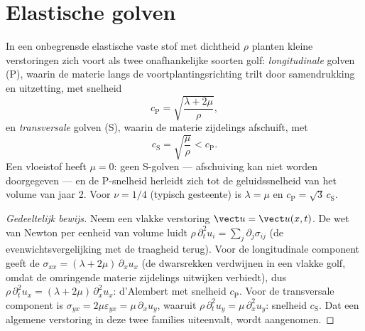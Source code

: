 \section{Elastische golven}

\begin{proposition}\label{prop:b3:continuum-elasticity:waves}
In een onbegrensde elastische vaste stof met dichtheid $\rho$ planten
kleine verstoringen zich voort als twee onafhankelijke soorten golf:
\emph{longitudinale} golven (P), waarin de materie langs de
voortplantingsrichting trilt door samendrukking en uitzetting, met
snelheid
\[
c_{\text{P}} = \sqrt{\frac{\lambda + 2\mu}{\rho}} ,
\]
en \emph{transversale} golven (S), waarin de materie zijdelings afschuift, met
\[
c_{\text{S}} = \sqrt{\frac{\mu}{\rho}} < c_{\text{P}} .
\]
Een vloeistof heeft $\mu = 0$: geen S-golven --- afschuiving kan niet
worden doorgegeven --- en de P-snelheid herleidt zich tot de
geluidssnelheid van het volume van jaar 2. Voor $\nu = 1/4$ (typisch
gesteente) is $\lambda = \mu$ en $c_{\text{P}} =
\sqrt3\,c_{\text{S}}$.
\end{proposition}

\begin{proof}[Gedeeltelijk bewijs]
Neem een vlakke verstoring $\vect u = \vect u(x, t)$. De wet van Newton
per eenheid van volume luidt $\rho\,\partial_t^2u_i = \sum_j\partial_j\sigma_{ij}$ (de evenwichtsvergelijking met de traagheid
terug). Voor de longitudinale component geeft de 
$\sigma_{xx} = (\lambda +
2\mu)\,\partial_xu_x$ (de dwarsrekken
verdwijnen in een vlakke golf, omdat de omringende materie zijdelings
uitwijken verbiedt), dus $\rho\,\partial_t^2u_x = (\lambda + 2\mu)\,\partial_x^2u_x$: d'Alembert met snelheid $c_{\text{P}}$. Voor de
transversale component is $\sigma_{yx} =
2\mu\varepsilon_{yx} = \mu\,\partial_xu_y$, waaruit $\rho\,\partial_t^2u_y = \mu\,\partial_x^2u_y$: snelheid $c_{\text{S}}$. Dat een algemene
verstoring in deze twee families uiteenvalt, wordt aangenomen.
\end{proof}

